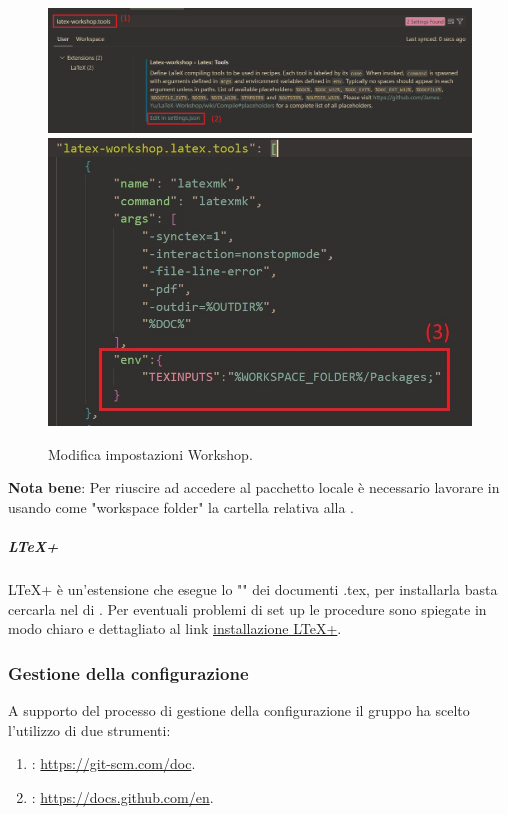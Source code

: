 \begin{figure}[H]
    \center
    \includegraphics[scale=0.4]{Sezioni/ProcessiDiSupporto/Immagini/texinputs_setup.png}
    \includegraphics[]{Sezioni/ProcessiDiSupporto/Immagini/texinputs_setup_json.jpg}
    \caption{Modifica impostazioni  Workshop.}
    \label{fig:texinputs}
\end{figure}
\textbf{Nota bene}: Per riuscire ad accedere al pacchetto locale è necessario lavorare in  usando come "workspace folder" la cartella relativa alla .

\subparagraph{LTeX+}
LTeX+ è un'estensione che esegue lo "" dei documenti .tex, per installarla basta cercarla nel  di .
Per eventuali problemi di set up le procedure sono spiegate in modo chiaro e dettagliato al link \href{https://ltex-plus.github.io/ltex-plus/vscode-ltex-plus/setting-scopes-files.html}{installazione LTeX+}.

\subsubsection{Gestione della configurazione}
A supporto del processo di gestione della configurazione il gruppo ha scelto l'utilizzo di due strumenti:
\begin{enumerate}
    \item {}: \href{https://git-scm.com/doc}{https://git-scm.com/doc}.
    \item {}: \href{https://docs.github.com/en}{https://docs.github.com/en}.
\end{enumerate}

